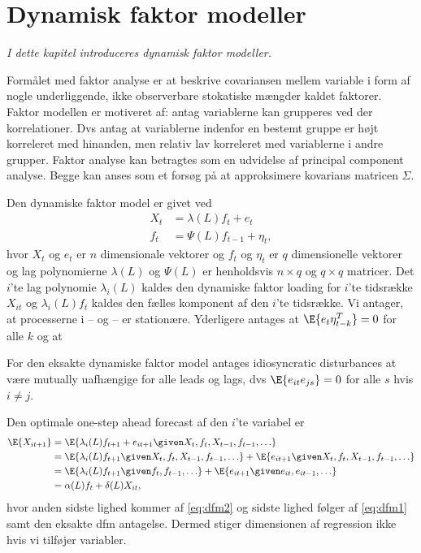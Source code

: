 \chapter{Dynamisk faktor modeller}
\textit{I dette kapitel introduceres dynamisk faktor modeller.}


Formålet med faktor analyse er at beskrive covariansen mellem variable i form af nogle underliggende, ikke observerbare stokatiske mængder kaldet faktorer.
Faktor modellen er motiveret af: antag variablerne kan grupperes ved der korrelationer.
Dvs antag at variablerne indenfor en bestemt gruppe er højt korreleret med hinanden, men relativ lav korreleret med variablerne i andre grupper.
Faktor analyse kan betragtes som en udvidelse af principal component analyse.
Begge kan anses som et forsøg på at approksimere kovarians matricen \(\Sigma\).




Den dynamiske faktor model er givet ved
\begin{align}
X_t &= \lambda(L) f_t + e_t \label{eq:dfm1}\\
f_t &= \Psi(L) f_{t-1} + \eta_t, \label{eq:dfm2}
\end{align} 
hvor $X_t$ og $e_t$ er \(n\) dimensionale vektorer og $f_t$ og $\eta_t$ er \(q\) dimensionelle vektorer og lag polynomierne $\lambda(L)$ og $\Psi(L)$ er henholdsvis $n \times q$ og $q \times q$ matricer.
Det $i$'te lag polynomie $\lambda_i(L)$ kaldes den dynamiske faktor loading for $i$'te tidsrække $X_{it}$ og $\lambda_i(L) f_t$ kaldes den fælles komponent af den $i$'te tidsrække.
Vi antager, at processerne i -- og -- er stationære.
Yderligere antages at $\E{e_t \eta_{t-k}^T}=0$ for alle $k$ og at

For den eksakte dynamiske faktor model antages idiosyncratic disturbances at være mutually uafhængige for alle leads og lags, dvs $\E{e_{it} e_{js}}=0$ for alle $s$ hvis $i \neq j$.

Den optimale one-step ahead forecast af den $i$'te variabel er
\begin{align*}
\E{X_{it+1}} &= \E{\lambda_i(L)f_{t+1} + e_{it+1} \given X_t,f_t,X_{t-1},f_{t-1},\ldots} \\
&= \E{\lambda_i(L)f_{t+1} \given X_t,f_t,X_{t-1},f_{t-1},\ldots} + \E{e_{it+1} \given X_t,f_t,X_{t-1},f_{t-1},\ldots} \\
&= \E{\lambda_i(L)f_{t+1} \given f_t, f_{t-1}, \ldots} + \E{e_{it+1} \given e_{it}, e_{it-1}, \ldots} \\
&= \alpha(L) f_t + \delta(L) X_{it},
\end{align*}
hvor anden sidste lighed kommer af \eqref{eq:dfm2} og sidste lighed følger af \eqref{eq:dfm1} samt den eksakte dfm antagelse.
Dermed stiger dimensionen af regression ikke hvis vi tilføjer variabler.

